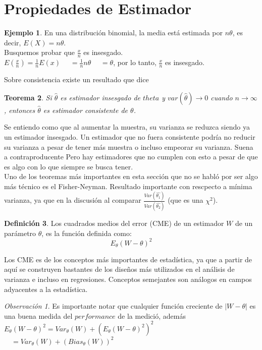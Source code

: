 \documentclass[11pt,a4paper,oneside]{report}
\theoremstyle{definition}
\newtheorem{definicion}{Definición}[chapter]
\newtheorem{ejemplo}[definicion]{Ejemplo}
\theoremstyle{plain}
\newtheorem{teorema}[definicion]{Teorema}
\theoremstyle{remark}
\newtheorem*{observacion}{Observación}
\begin{document}
\section{Propiedades de Estimador}

\begin{ejemplo}
  En una distribución binomial, la media está estimada por $n\theta$, es decir, $E(X)=n\theta$.\\
  Busquemos probar que $\frac{x}{n}$ es insesgado.\\
  $E(\frac{x}{n})=\frac{1}{n}E(x)$
  $\quad =\frac{1}{n}n\theta$
  $\quad = \theta$, por lo tanto, $\frac{x}{n}$ es insesgado. 
\end{ejemplo}

Sobre consistencia existe un resultado que dice 

\begin{teorema}
  Si $\hat{\theta}$ es estimador insesgado de $theta$ y $var(\hat{\theta})\rightarrow 0$ cuando $n\rightarrow \infty$, 
  entonces $\hat{\theta}$ es estimador consistente de $\theta$.
\end{teorema}

Se entiendo como que al aumentar la muestra, su varianza se reduzca siendo ya un estimador insesgado. Un estimador que no
fuera consistente podría no reducir su varianza a pesar de tener más muestra o incluso empeorar su varianza. Suena a contraproducente
Pero hay estimadores que no cumplen con esto a pesar de que es algo con lo que siempre se busca tener.\\
Uno de los teoremas más importantes en esta sección que no se habló por ser algo más técnico es el 
Fisher-Neyman. Resultado importante con rescpecto a mínima varianza, ya que en la discusión al comparar 
$\frac{Var(\hat{\theta_1})}{Var(\hat{\theta_2})}$ (que es una $\chi^2$).

\begin{definicion}
  Los cuadrados medios del error (CME) de un estimador $W$ de un parámetro $\theta$, es la función definida como:
  \[E_\theta(W-\theta)^2 \] 
\end{definicion}
Los CME es de los conceptos más importantes de estadística, ya que a partir de aquí se construyen bastantes de los diseños más 
utilizados en el análisis de varianza e incluso en regresiones. Conceptos semejantes son análogos en campos adyacentes a la 
estadística. 
\begin{observacion}
  Es importante notar que cualquier función creciente de $|W-\theta|$ es una buena medida del $performance$ de la medició,
  además\\
  $E_\theta(W-\theta)^{2}=Var_\theta(W)+(E_\theta(W-\theta)^2)^{2}$\\
  $\quad = Var_\theta(W) + (Bias_\theta (W))^{2}$
\end{observacion}
\end{document}

